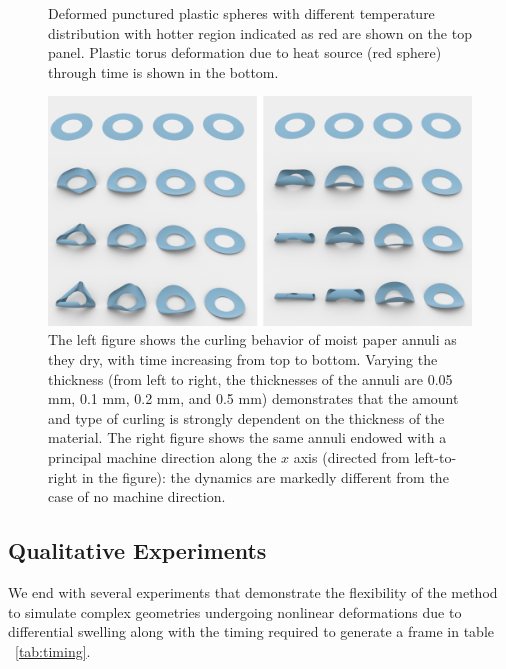 \documentclass[timestamp,acmtog]{acmart}
\begin{document}
\begin{figure}[!h]
\begin{minipage}[t]{0.45\linewidth}
    \caption{Deformed punctured plastic spheres with different temperature distribution with hotter region indicated as red are shown on the top panel. Plastic torus deformation due to heat source (red sphere) through time is shown in the bottom. }
    \label{fig:TorusandSphere}
\end{minipage}        
\end{figure}

\begin{figure}[h]
  \centering
  \includegraphics[width=\textwidth]{Annuli.png}
  \caption{The left figure shows the curling behavior of moist paper annuli as they dry, with time increasing from top to bottom. Varying the thickness (from left to right, the thicknesses of the annuli are 0.05 mm, 0.1 mm, 0.2 mm, and 0.5 mm) demonstrates that the amount and type of curling is strongly dependent on the thickness of the material. The right figure shows the same annuli endowed with a principal machine direction along the $x$ axis (directed from left-to-right in the figure): the dynamics are markedly different from the case of no machine direction. }
  \label{Annuli}
\end{figure}

\subsection{Qualitative Experiments}
We end with several experiments that demonstrate the flexibility of the method to simulate complex geometries undergoing nonlinear deformations due to differential swelling along with the timing required to generate a frame in table ~\ref{tab:timing}.
\end{document}
